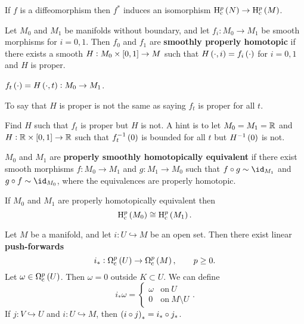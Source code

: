 \begin{exercise*}
If $ f $ is a diffeomorphism then $ f^* $ induces an isomorphism $ \H_\c^p\br{N} \to \H_\c^p\br{M} $.
\end{exercise*}


\begin{definition}
Let $ M_0 $ and $ M_1 $ be manifolds without boundary, and let $ f_i : M_0 \to M_1 $ be smooth morphisms for $ i = 0, 1 $. Then $ f_0 $ and $ f_1 $ are \textbf{smoothly properly homotopic} if there exists a smooth $ H : M_0 \times \sbr{0, 1} \to M $ such that $ H\br{\cdot, i} = f_i\br{\cdot} $ for $ i = 0, 1 $ and $ H $ is proper.
\end{definition}

\begin{notation*}
$ f_t\br{\cdot} = H\br{\cdot, t} : M_0 \to M_1 $.
\end{notation*}

\begin{remark*}
To say that $ H $ is proper is not the same as saying $ f_t $ is proper for all $ t $.
\end{remark*}

\begin{exercise*}
Find $ H $ such that $ f_t $ is proper but $ H $ is not. A hint is to let $ M_0 = M_1 = \mathbb{R} $ and $ H : \RR \times \sbr{0, 1} \to \RR $ such that $ f_t^{-1}\br{0} $ is bounded for all $ t $ but $ H^{-1}\br{0} $ is not.
\end{exercise*}

\begin{definition}
$ M_0 $ and $ M_1 $ are \textbf{properly smoothly homotopically equivalent} if there exist smooth morphisms $ f : M_0 \to M_1 $ and $ g : M_1 \to M_0 $ such that $ f \circ g \sim \id_{M_1} $ and $ g \circ f \sim \id_{M_0} $, where the equivalences are properly homotopic.
\end{definition}

\begin{proposition}
If $ M_0 $ and $ M_1 $ are properly homotopically equivalent then
$$ \H_\c^p\br{M_0} \cong \H_\c^p\br{M_1}. $$
\end{proposition}

Let $ M $ be a manifold, and let $ i : U \hookrightarrow M $ be an open set. Then there exist linear \textbf{push-forwards}
$$ i_* : \Omega_\c^p\br{U} \to \Omega_\c^p\br{M}, \qquad p \ge 0. $$
Let $ \omega \in \Omega_\c^p\br{U} $. Then $ \omega = 0 $ outside $ K \subset U $. We can define
$$ i_*\omega =
\begin{cases}
\omega & \text{on} \ U \\
0 & \text{on} \ M \setminus U
\end{cases}.
$$
If $ j : V \hookrightarrow U $ and $ i : U \hookrightarrow M $, then $ \br{i \circ j}_* = i_* \circ j_* $.

